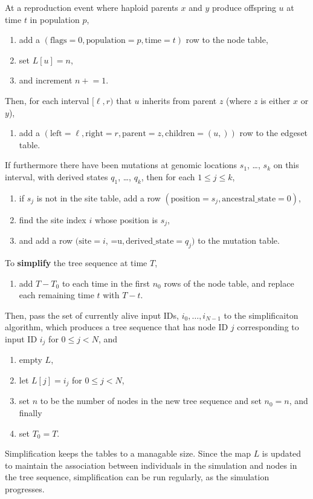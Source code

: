 \documentclass{article}
\begin{document}
At a reproduction event where haploid parents $x$ and $y$ produce offspring $u$
at time $t$ in population $p$,
\begin{enumerate}
    \item add a
        $(
        \text{flags}=0,
        \text{population}=p,
        \text{time}=t)$ row to the node table,
    \item set $L[u] = n$,
    \item and increment $n\mathrel{+}=1$.
\end{enumerate}
Then, for each interval $[\ell,r)$ that $u$ inherits from parent $z$
(where $z$ is either $x$ or $y$),
\begin{enumerate}[resume]
    \item add a
        $( \text{left}=\ell,
        \text{right}=r,
        \text{parent}=z,
        \text{children}=(u,))$ row to the edgeset table.
\end{enumerate}
If furthermore there have been mutations at genomic locations $s_1$, \ldots, $s_k$
on this interval,
with derived states $q_1$, \ldots, $q_k$,
then for each $1 \le j \le k$,
\begin{enumerate}[resume]
    \item if $s_j$ is not in the site table, add a row
        $( \text{position}=s_j,
        \text{ancestral\_state}=0)$,
    \item find the site index $i$ whose position is $s_j$,
    \item and add a row
        $( \text{site}=i$,
           =u$,
        \text{derived\_state}=q_j)$ to the mutation table.
\end{enumerate}

To \textbf{simplify} the tree sequence at time $T$,
\begin{enumerate}
    \item add $T-T_0$ to each time in the first $n_0$ rows of the node table,
        and replace each remaining time $t$ with $T-t$.
\end{enumerate}
Then, pass the set of currently alive input IDs,
$i_0, \ldots, i_{N-1}$ to the simplificaiton algorithm,
which produces a tree sequence that has node ID $j$ corresponding to input ID $i_j$
for $0 \le j < N$, and
\begin{enumerate}[resume]
    \item empty $L$,
    \item let $L[j] = i_j$ for $0 \le j < N$,
    \item set $n$ to be the number of nodes in the new tree sequence and set $n_0 = n$, and finally
    \item set $T_0 = T$.
\end{enumerate}

Simplification keeps the tables to a managable size.
Since the map $L$ is updated to maintain the association between individuals in the simulation
and nodes in the tree sequence, simplification can be run regularly,
as the simulation progresses.
\end{document}
